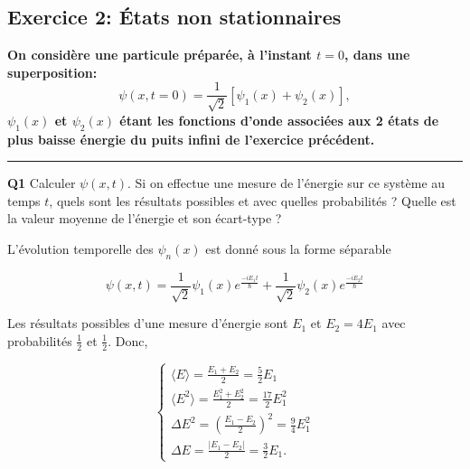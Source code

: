\documentclass[french]{article}
\begin{document}
	\subsection*{Exercice 2: États non stationnaires}
	\textbf{On considère une particule préparée, à l'instant $t=0$, dans une superposition:
		\begin{equation}
		\psi(x, t=0) = \frac{1}{\sqrt{2}}[\psi_1(x) + \psi_2(x)],
		\end{equation}
		$\psi_1(x)$ et $\psi_2(x)$ étant les fonctions d'onde associées aux 2 états de plus baisse énergie du puits infini de l'exercice précédent.
	}
	\vspace{.3cm}
	\hrule
	\vspace{.3cm}
	{%
		\begin{tcolorbox}[colback=gray!5!white,colframe=gray!75!black]
			\textbf{\large{Q1}} Calculer $\psi(x,t)$. Si on effectue une mesure de l'énergie sur ce système au temps $t$, quels sont les résultats possibles et avec quelles probabilités ? Quelle est la valeur moyenne de l'énergie et son écart-type ?
		\end{tcolorbox}
		
		L'évolution temporelle des $\psi_n(x)$ est donné sous la forme séparable
		
		\begin{equation}
			\psi(x, t) = \frac{1}{\sqrt{2}}\psi_1(x)e^{\frac{-iE_1t}{\hbar}} + \frac{1}{\sqrt{2}}\psi_2(x)e^{\frac{-iE_2t}{\hbar}}
		\end{equation}
		
		Les résultats possibles d'une mesure d'énergie sont $E_1$ et $E_2 = 4E_1$ avec probabilités $\frac{1}{2}$ et $\frac{1}{2}$. Donc,
		
		\begin{equation}
			\begin{cases}
				\langle E \rangle = \frac{E_1 + E_2}{2} = \frac{5}{2}E_1\\
				\langle E^2 \rangle = \frac{E_1^2 + E_2^2}{2} = \frac{17}{2}E_1^2\\
				\Delta E^2 = \left(\frac{E_1 - E_2}{2}\right)^2 = \frac{9}{4}E_1^2 \\
				\Delta E = \frac{|E_1 - E_2|}{2} = \frac{3}{2}E_1.
			\end{cases}
		\end{equation}
	}
\end{document}
